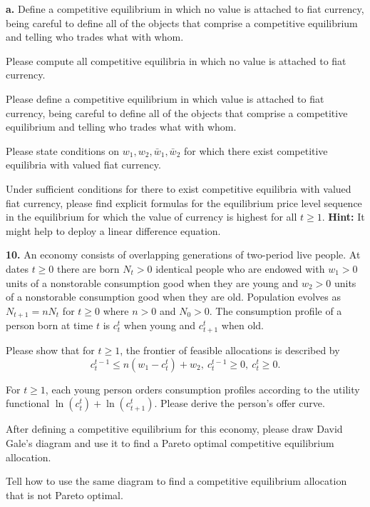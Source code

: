 \medskip
\noindent 
{\bf a.} Define a competitive equilibrium in which no value is attached to fiat currency, being careful to define all
of the objects that comprise a competitive equilibrium and telling who trades what with whom.

\medskip
{} Please compute all competitive equilibria in which no value is attached to fiat currency.

\medskip
{} Please define a competitive equilibrium in which value is attached to fiat currency, 
being careful to define all
of the objects that comprise a competitive equilibrium and telling who trades what with whom.

\medskip
{} Please state conditions on $w_1, w_2, \bar w_1, \bar w_2$ for which there exist competitive
equilibria with valued fiat currency.

\medskip
{} Under sufficient conditions for there to exist competitive equilibria with valued fiat currency,
please find explicit formulas for the equilibrium price level sequence in the equilibrium for which the value
of currency is highest for all $t \geq 1$. {\bf Hint:} It might help to deploy a linear difference equation.

\medskip
\noindent 
{\bf 10.} An economy consists of overlapping generations of two-period live people. At dates $t \geq 0$ there are born
$N_t >0$ identical people who are endowed with $w_1 >0$ units of a nonstorable consumption good when they
are young and $w_2 >0 $ units of a nonstorable consumption good when they are old.  Population evolves as $N_{t+1} = n N_t$ for $t \geq 0$ where $n >0$ and $N_0 >0$.  The consumption profile
of a person born at time $t$ is $c_t^t$ when young and $c_{t+1}^t$ when old.

\medskip
{} Please show that for $t \geq 1$, the frontier of feasible allocations is described by
$$ c_t^{t-1} \le n(w_1- c_t^t) + w_2, \ c_t^{t-1} \geq 0, \ c_t^t \geq 0 .$$

\medskip
{}  For $t \geq 1$, each young person  orders consumption profiles according to the
utility functional
$ \ln (c_t^t) + \ln (c^t_{t+1}) .$
Please derive the person's offer curve.

\medskip
{} After defining a competitive equilibrium for this economy, please draw David Gale's diagram and use it to find a Pareto optimal competitive equilibrium  allocation.

\medskip
{} Tell how to use the same diagram to find a competitive equilibrium allocation that is not Pareto optimal.





 

\bye



